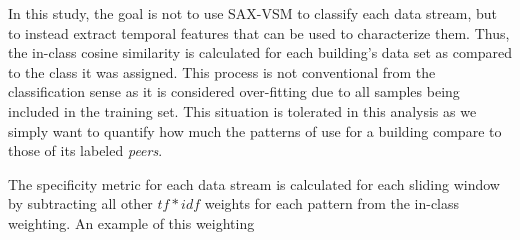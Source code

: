 In this study, the goal is not to use SAX-VSM to classify each data stream, but to instead extract temporal features that can be used to characterize them. Thus, the in-class cosine similarity is calculated for each building's data set as compared to the class it was assigned. This process is not conventional from the classification sense as it is considered over-fitting due to all samples being included in the training set. This situation is tolerated in this analysis as we simply want to quantify how much the patterns of use for a building compare to those of its labeled \emph{peers}.

The specificity metric for each data stream is calculated for each sliding window by subtracting all other $tf*idf$ weights for each pattern from the in-class weighting. An example of this weighting